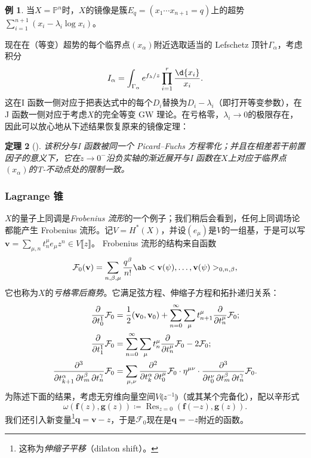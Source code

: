 \documentclass{amsart}
\newtheorem{thm}{定理}[section]
\theoremstyle{definition}
\newtheorem{exm}[thm]{例}
\theoremstyle{remark}
\theoremstyle{plain}
\theoremstyle{definition}
\theoremstyle{remark}
\renewcommand{\P}{\mathbb{P}}
\newcommand{\mc}[1]{\mathcal{#1}}
\newcommand{\mbf}[1]{\mathbf{#1}}
\newcommand{\bv}{\mbf{v}}
\newcommand{\bq}{\mbf{q}}
\newcommand{\on}[1]{\operatorname{#1}}
\newcommand{\1}{\mathbf{1}}
\newcommand{\2}{\mathbf{2}}
\newcommand{\3}{\mathbf{3}}
\newcommand{\ps}[1]{\llbracket #1 \rrbracket}
\newcommand{\ls}[1]{\llparenthesis #1 \rrparenthesis}
\begin{document}
\begin{exm}
    当\(X = \P^n\)时，\(X\)的镜像是簇\(E_q = (x_1 \cdots x_{n+1} = q)\)上的超势\(\sum_{i=1}^{n+1} (x_i - \lambda_i \log x_i)\)。
\end{exm}

现在在（等变）超势的每个临界点\((x_{\alpha})\)附近选取适当的 Lefschetz 顶针\(\Gamma_{\alpha}\)，考虑积分
\[ I_{\alpha} = \int_{\Gamma_{\alpha}} e^{f_{\lambda}/z} \prod_{i=1}^r \frac{\d{x_i}}{x_i}. \]
这在I 函数一侧对应于把表达式中的每个\(D_i\)替换为\(D_i - \lambda_i\)（即打开等变参数），在J 函数一侧对应于考虑\(X\)的完全等变 GW 理论。在亏格零，\(\lambda_i \to 0\)的极限存在，因此可以放心地从下述结果恢复原来的镜像定理：

\begin{thm}[{\cite{Givental1996}}]
    该积分与I 函数被同一个 Picard--Fuchs 方程零化；并且在相差若干前置因子的意义下，它在\(z \to 0^-\)沿负实轴的渐近展开与I 函数在\(X\)上对应于临界点\(( x_{\alpha} )\)的T-不动点处的限制一致。
\end{thm}


\subsubsection{Lagrange 锥}%
\label{ssub:The Lagrangian cone}

\(X\)的量子上同调是\textit{Frobenius 流形}的一个例子；我们稍后会看到，任何上同调场论都能产生 Frobenius 流形。记\(V = H^*(X)\)，并设\((e_{\mu})\)是\(V\)的一组基，于是可以写$\bv = \sum_{\mu,n} t^{\mu}_n e_{\mu} z^n \in V\ps{z}$。
Frobenius 流形的结构来自函数
\[
    \mc{F}_0(\bv) = \sum_{n, \beta, \mu} \frac{q^{\beta}}{n!} \ab<\bv(\psi), \ldots, \bv(\psi)>_{0,n,\beta},
\]
它也称为\(X\)的\textit{亏格零后裔势}。它满足弦方程、伸缩子方程和拓扑递归关系：
\begin{align*}
    \pdv{}{t_0^1} \mc{F}_0 &= \frac{1}{2} (\bv_0, \bv_0) + \sum_{n=0}^{\infty} \sum_{\mu} t_{n+1}^{\mu} \pdv{}{t_n^{\mu}} \mc{F}_0; \\
    \pdv{}{t_1^1} \mc{F}_0 &= \sum_{n=0}^{\infty} \sum_{\mu} t_n^{\mu} \pdv{}{t_n^{\mu}}\mc{F}_0 - 2 \mc{F}_0; \\
    \pdv{}{t_{k+1}^{\alpha},t_m^{\beta},t_n^{\gamma}} \mc{F}_0 &= \sum_{\mu,\nu} \pdv{}{t_k^{\alpha},t_0^{\mu}} \mc{F}_0 \cdot \eta^{\mu\nu} \cdot \pdv{}{t_0^{\nu},t_{m}^{\beta},t_n^{\gamma}} \mc{F}_0.
\end{align*}
为陈述下面的结果，考虑无穷维向量空间$V\ls{z^{-1}}$（或其某个完备化），配以辛形式
\[ \omega(\mbf{f}(z), \mbf{g}(z)) \coloneqq \on{Res}_{z=0}(\mbf{f}(-z), \mbf{g}(z)). \]
我们还引入新变量\footnote{这称为\textit{伸缩子平移}（dilaton shift）。}$\bq = \bv - z$，于是$\mc{F}_0$现在是$\bq = -z$附近的函数。
\end{document}
